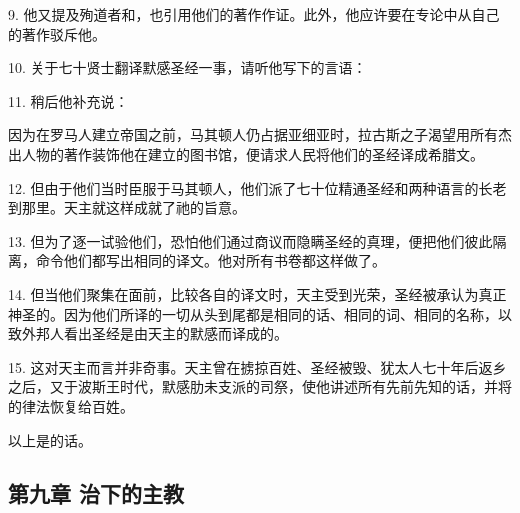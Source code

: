 9. 他又提及殉道者和，也引用他们的著作作证。此外，他应许要在专论中从自己的著作驳斥他。\par

10. 关于七十贤士翻译默感圣经一事，请听他写下的言语：\par

\par

11. 稍后他补充说：\par

因为在罗马人建立帝国之前，马其顿人仍占据亚细亚时，拉古斯之子渴望用所有杰出人物的著作装饰他在建立的图书馆，便请求人民将他们的圣经译成希腊文。\par

12. 但由于他们当时臣服于马其顿人，他们派了七十位精通圣经和两种语言的长老到那里。天主就这样成就了祂的旨意。\par

13. 但为了逐一试验他们，恐怕他们通过商议而隐瞒圣经的真理，便把他们彼此隔离，命令他们都写出相同的译文。他对所有书卷都这样做了。\par

14. 但当他们聚集在面前，比较各自的译文时，天主受到光荣，圣经被承认为真正神圣的。因为他们所译的一切从头到尾都是相同的话、相同的词、相同的名称，以致外邦人看出圣经是由天主的默感而译成的。\par

15. 这对天主而言并非奇事。天主曾在掳掠百姓、圣经被毁、犹太人七十年后返乡之后，又于波斯王时代，默感肋未支派的司祭，使他讲述所有先前先知的话，并将的律法恢复给百姓。\par

以上是的话。\par


\subsection{第九章 治下的主教}

